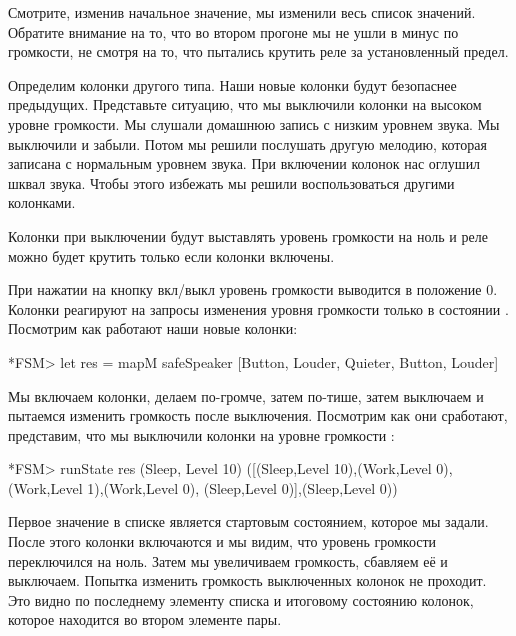 Смотрите, изменив начальное значение, мы изменили
весь список значений.
Обратите внимание на то, что во втором прогоне мы не ушли в минус
по громкости, не смотря на то, что пытались крутить реле за 
установленный предел.

Определим колонки другого типа. Наши новые колонки
будут безопаснее предыдущих. Представьте ситуацию, что 
мы выключили колонки на высоком уровне громкости.
Мы слушали домашнюю запись с низким уровнем звука.
Мы выключили и забыли. Потом мы решили послушать 
другую мелодию, которая записана с нормальным уровнем
звука. При включении колонок нас оглушил шквал звука.
Чтобы этого избежать мы решили воспользоваться 
другими колонками.

Колонки при выключении будут выставлять уровень 
громкости на ноль и реле можно будет крутить
только если колонки включены.



При нажатии на кнопку вкл/выкл уровень громкости выводится
в положение 0. Колонки реагируют на запросы изменения
уровня громкости только в состоянии . Посмотрим
как работают наши новые колонки:

\begin{code}
*FSM> let res = mapM safeSpeaker [Button, Louder, Quieter, Button, Louder]
\end{code}

Мы включаем колонки, делаем по-громче, затем по-тише, затем
выключаем и пытаемся изменить громкость после выключения.
Посмотрим как они сработают, представим, что мы выключили
колонки на уровне громкости :

\begin{code}
*FSM> runState res (Sleep, Level 10)
([(Sleep,Level 10),(Work,Level 0),(Work,Level 1),(Work,Level 0),
 (Sleep,Level 0)],(Sleep,Level 0))
\end{code}

Первое значение в списке является стартовым состоянием, которое
мы задали. После этого колонки включаются и мы видим, что
уровень громкости переключился на ноль. Затем мы увеличиваем 
громкость, сбавляем её и выключаем. Попытка изменить 
громкость выключенных колонок не проходит. Это видно
по последнему элементу списка и итоговому состоянию колонок,
которое находится во втором элементе пары.

